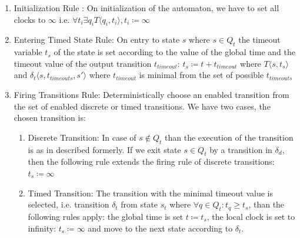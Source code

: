 			\begin{enumerate}
				\item Initialization Rule : On initialization of the automaton, we have to set all clocks to $\infty$ 
				i.e. $\forall t_i \exists q_i T \langle q_i, t_i \rangle, t_i \coloneqq \infty $
				
				\item Entering Timed State Rule: On entry to state $s$ where $s \in Q_t$ the timeout variable $t_s$ of the state is set according to the value of the global time and the timeout value of the output transition $t_{timeout}$:
					$t_s\coloneqq t+t_{timeout}$
					where $T\langle s,t_s \rangle$ and $\delta_t\langle s,t_{timeouts},s' \rangle$ where $t_{timeout}$ is minimal from the set of possible $t_{timeouts}$ 
				
				\item Firing Transitions Rule: Deterministically choose an enabled transition from the set of enabled discrete or timed transitions. We have two cases, the chosen transition is:
					\begin{enumerate}
						\item Discrete Transition: In case of $s \notin Q_t$ than the execution of the transition is as in described formerly. If we exit state $s \in Q_t$ by a transition in $\delta_d$, 
						then the following rule extends the firing rule of discrete transitions:
							$t_s \coloneqq \infty$
						\item Timed Transition: The transition with the minimal timeout value is selected, i.e. transition $\delta_t$ from state $s_t$ where $\forall q \in Q_t: t_q \geq t_s$, than the following rules apply:
						 the global time is set $t \coloneqq t_s$, the local clock is set to infinity: $t_s \coloneqq \infty$ and move to the next state according to $\delta_t$.
					\end{enumerate}			
			\end{enumerate}
		
